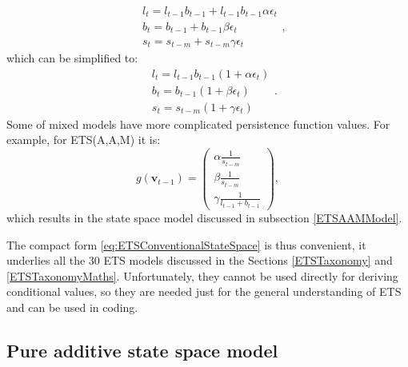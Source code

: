 \documentclass[]{book}
\theoremstyle{definition}
\theoremstyle{definition}
\theoremstyle{definition}
\theoremstyle{definition}
\theoremstyle{remark}
\begin{document}
\begin{enumerate}
  \begin{equation}
    \begin{aligned}
    & {l}_{t} = l_{t-1} b_{t-1} + l_{t-1} b_{t-1} \alpha\epsilon_t \\
    & b_t = b_{t-1} + b_{t-1} \beta\epsilon_t \\
    & s_t = s_{t-m} + s_{t-m} \gamma\epsilon_t
    \end{aligned},
    \label{eq:ETSMMMTransitionEquation01}
  \end{equation}
  which can be simplified to:
  \begin{equation}
    \begin{aligned}
    & {l}_{t} = l_{t-1}b_{t-1} (1+\alpha\epsilon_t)\\
    & b_t = b_{t-1} (1+\beta\epsilon_t)\\
    & s_t = s_{t-m} (1+\gamma\epsilon_t)
    \end{aligned} .
    \label{eq:ETSMMMTransitionEquation}
  \end{equation}
  Some of mixed models have more complicated persistence function values. For example, for ETS(A,A,M) it is:
  \begin{equation}
    g(\mathbf{v}_{t-1}) =
    \begin{pmatrix}
     \alpha \frac{1}{s_{t-m}} \\
     \beta \frac{1}{s_{t-m}} \\
     \gamma \frac{1}{l_{t-1} + b_{t-1}}
    \end{pmatrix} ,
  \end{equation}
  which results in the state space model discussed in subsection \ref{ETSAAMModel}.
\end{enumerate}

The compact form \eqref{eq:ETSConventionalStateSpace} is thus convenient, it underlies all the 30 ETS models discussed in the Sections \ref{ETSTaxonomy} and \ref{ETSTaxonomyMaths}. Unfortunately, they cannot be used directly for deriving conditional values, so they are needed just for the general understanding of ETS and can be used in coding.

\hypertarget{ETSConventionalModelAdditive}{%
\subsection{Pure additive state space model}\label{ETSConventionalModelAdditive}}
\end{document}
